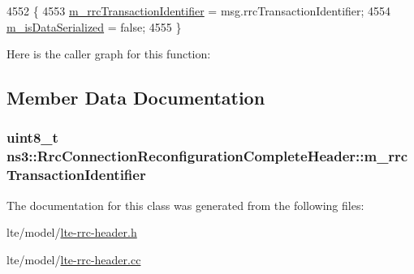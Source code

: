 \begin{DoxyCode}
4552 \{
4553   \hyperlink{classns3_1_1RrcConnectionReconfigurationCompleteHeader_a038e16c738817d98f5fcee492c146af1}{m\_rrcTransactionIdentifier} = msg.rrcTransactionIdentifier;
4554   \hyperlink{classns3_1_1Asn1Header_ae39d42f09e8ec85d8180843625fc92ba}{m\_isDataSerialized} = \textcolor{keyword}{false};
4555 \}
\end{DoxyCode}


Here is the caller graph for this function\+:




\subsection{Member Data Documentation}
\subsubsection[{\texorpdfstring{m\+\_\+rrc\+Transaction\+Identifier}{m_rrcTransactionIdentifier}}]{\setlength{\rightskip}{0pt plus 5cm}uint8\+\_\+t ns3\+::\+Rrc\+Connection\+Reconfiguration\+Complete\+Header\+::m\+\_\+rrc\+Transaction\+Identifier\hspace{0.3cm}{\ttfamily [private]}}\hypertarget{classns3_1_1RrcConnectionReconfigurationCompleteHeader_a038e16c738817d98f5fcee492c146af1}{}\label{classns3_1_1RrcConnectionReconfigurationCompleteHeader_a038e16c738817d98f5fcee492c146af1}


The documentation for this class was generated from the following files\+:\begin{DoxyCompactItemize}
\item 
lte/model/\hyperlink{lte-rrc-header_8h}{lte-\/rrc-\/header.\+h}\item 
lte/model/\hyperlink{lte-rrc-header_8cc}{lte-\/rrc-\/header.\+cc}\end{DoxyCompactItemize}
